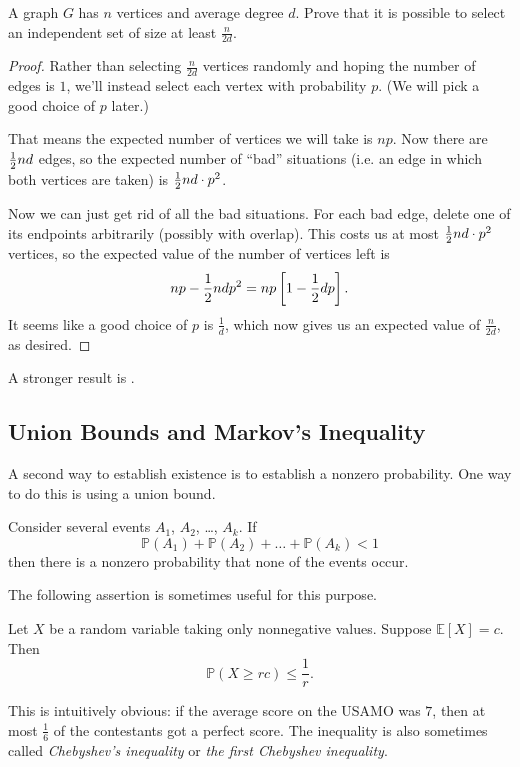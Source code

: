 \documentclass[11pt]{scrartcl}
\newcommand\EE{\mathbb E}
\newcommand\PP{\mathbb P}
\begin{document}
\begin{example}
   A graph $G$ has $n$ vertices and average degree $d$.
  Prove that it is possible to select an independent set of size at least $\frac{n}{2d}$.
\end{example}
\begin{proof}
  Rather than selecting $\frac{n}{2d}$ vertices randomly and hoping the number of edges is $1$,
  we'll instead select each vertex with probability $p$.
  (We will pick a good choice of $p$ later.)

  That means the expected number of vertices we will take is $np$.
  Now there are $\frac{1}{2} nd$ edges, so the expected number of ``bad'' situations ({i.e.} an edge
  in which both vertices are taken) is $\frac{1}{2} nd \cdot p^2$.

  Now we can just get rid of all the bad situations.
  For each bad edge, delete one of its endpoints arbitrarily (possibly with overlap).
  This costs us at most $\frac{1}{2} nd \cdot p^2$ vertices, so the expected value
  of the number of vertices left is
  \[ np - \frac{1}{2} nd p^2 = np \left[ 1 - \frac{1}{2} dp \right]. \]
  It seems like a good choice of $p$ is $\frac 1d$, which now gives us an expected value
  of $\frac{n}{2d}$, as desired.
\end{proof}
A stronger result is .


\subsection{Union Bounds and Markov's Inequality}
A second way to establish existence is to establish a nonzero probability.
One way to do this is using a union bound.
\begin{proposition}
  Consider several events $A_1$, $A_2$, \dots, $A_k$.  If
  \[ \PP(A_1) + \PP(A_2) + \dots + \PP(A_k) < 1 \]
  then there is a nonzero probability that none of the events occur.
\end{proposition}

The following assertion is sometimes useful for this purpose.
\begin{theorem}
  Let $X$ be a random variable taking only nonnegative values.
  Suppose $\EE[X] = c$. Then
  \[ \PP(X \ge rc) \le \frac{1}{r} . \]
\end{theorem}
This is intuitively obvious: if the average score on the USAMO was $7$,
then at most $\frac 16$ of the contestants got a perfect score.
The inequality is also sometimes called \emph{Chebyshev's inequality} or
\emph{the first Chebyshev inequality}.
\end{document}
